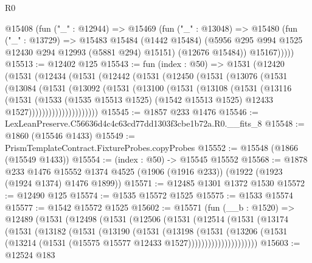 \begin{lexlean}{R0}
\begin{coremodule}
        @15408
          (fun ("_" : @12944) =>
          @15469
            (fun ("_" : @13048) =>
            @15480
              (fun ("_" : @13729) =>
              @15483
                @15484
                (@1442 @15484)
                (@5956 @295 @994 @1525 @12430 @294 @12993 (@5881 @294) @15151)
                (@12676 @15484))
              @15167)))))
@15513 := @12402 @125
@15543 := fun (index : @50) =>
  @1531
    (@12420
      (@1531
        (@12434
          (@1531
            (@12442
              (@1531
                (@12450
                  (@1531
                    (@13076
                      (@1531
                        (@13084
                          (@1531
                            (@13092
                              (@1531
                                (@13100
                                  (@1531
                                    (@13108
                                      (@1531
                                        (@13116
                                          (@1531
                                            (@1533
                                              (@1535 @15513 @1525)
                                              (@1542 @15513 @1525)
                                              @12433
                                              @1527)))))))))))))))))))))
@15545 := @1857 @233 @1476
@15546 := LexLeanPreserve.C56636d4c4c63cd77dd1303f3cbe1b72a.R0.__fits_8
@15548 := @1860 (@15546 @1433)
@15549 := PrismTemplateContract.FixtureProbes.copyProbes
@15552 := @15548 (@1866 (@15549 @1433))
@15554 := (index : @50) -> @15545 @15552
@15568 := @1878
    @233
    @1476
    @15552
    @1374
    @4525
    (@1906 (@1916 @233))
    (@1922 (@1923 (@1924 @1374) @1476 @1899))
@15571 := @12485 @1301 @1372 @1530
@15572 := @12490 @125
@15574 := @1535 @15572 @1525
@15575 := @1533 @15574
@15577 := @1542 @15572 @1525
@15602 := @15571
    (fun (__b : @1520) =>
    @12489
      (@1531
        (@12498
          (@1531
            (@12506
              (@1531
                (@12514
                  (@1531
                    (@13174
                      (@1531
                        (@13182
                          (@1531
                            (@13190
                              (@1531
                                (@13198
                                  (@1531
                                    (@13206
                                      (@1531
                                        (@13214
                                          (@1531 (@15575 @15577 @12433 @1527)))))))))))))))))))))
@15603 := @12524 @183

\end{coremodule}
\end{lexlean}
